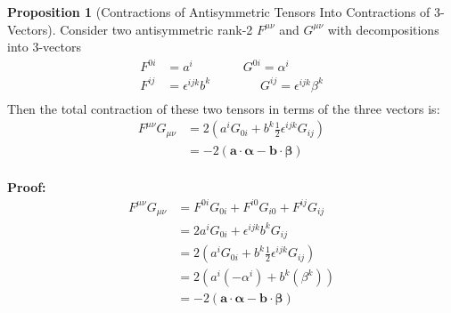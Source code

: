 \documentclass[12pt]{article}
\theoremstyle{definition}
\newtheorem{prop}{Proposition}[section]
\begin{document}
\begin{prop}[Contractions of Antisymmetric Tensors Into Contractions of 3-Vectors]
    Consider two antisymmetric rank-2 $F^{\mu\nu}$ and $G^{\mu\nu}$ with decompositions into 3-vectors
    \begin{equation*}
    \begin{split}
        F^{0i} &= a^i \qquad \qquad G^{0i} = \alpha^i \\
        F^{ij} &= \epsilon^{ijk} b^k \qquad \qquad G^{ij} = \epsilon^{ijk} \beta^k \\
    \end{split}
    \end{equation*}
    Then the total contraction of these two tensors in terms of the three vectors is:
    \begin{equation*}
    \begin{split}
        F^{\mu\nu} G_{\mu\nu}
            &= 2 (a^i G_{0i} + b^k \frac{1}{2} \epsilon^{ijk} G_{ij}) \\
            &= -2(\bm{a} \cdot \bm{\alpha} - \bm{b} \cdot \bm{\beta}) \\
    \end{split}
    \end{equation*}
\end{prop}

\textbf{Proof:}
\begin{equation*}
\begin{split}
    F^{\mu\nu} G_{\mu\nu}
        &= F^{0i} G_{0i} + F^{i0} G_{i0} + F^{ij} G_{ij} \\
        &= 2 a^i G_{0i} + \epsilon^{ijk} b^k G_{ij} \\
        &= 2 (a^i G_{0i} + b^k \frac{1}{2} \epsilon^{ijk} G_{ij}) \\
        &= 2 (a^i (-\alpha^i) + b^k (\beta^k)) \\
        &= -2 (\bm{a} \cdot \bm{\alpha} - \bm{b} \cdot \bm{\beta}) \\
\end{split}
\end{equation*}
\end{document}
